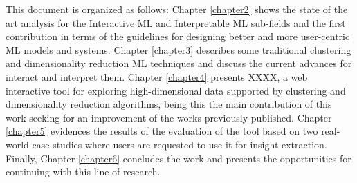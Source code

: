 This document is organized as follows: Chapter \ref{chapter2} shows the state of the art analysis for the Interactive ML and Interpretable ML sub-fields and the first contribution in terms of the guidelines for designing better and more user-centric ML models and systems. Chapter \ref{chapter3} describes some traditional clustering and dimensionality reduction ML techniques and discuss the current advances for interact and interpret them. Chapter \ref{chapter4} presents XXXX, a web interactive tool for exploring high-dimensional data supported by clustering and dimensionality reduction algorithms, being this the main contribution of this work seeking for an improvement of the works previously published.  Chapter \ref{chapter5} evidences the results of the evaluation of the tool based on two real-world case studies where users are requested to use it for insight extraction. Finally, Chapter \ref{chapter6} concludes the work and presents the opportunities for continuing with this line of research.